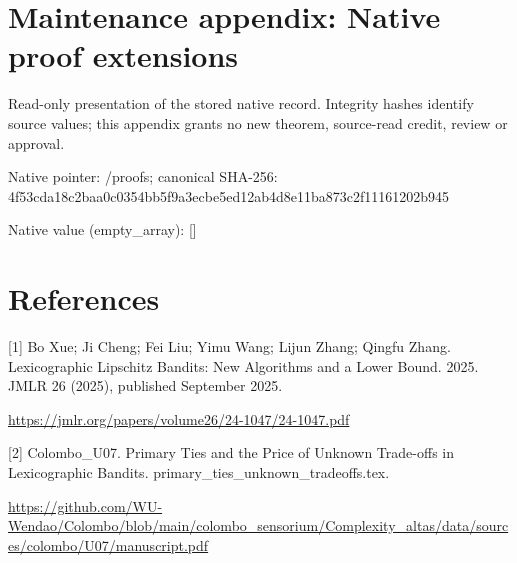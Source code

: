 \documentclass[10pt,a4paper]{article}
\begin{document}
\section{Maintenance appendix: Native proof extensions}


Read-only presentation of the stored native record. Integrity hashes identify source values; this appendix grants no new theorem, source-read credit, review or approval.



Native pointer: /proofs; canonical SHA-256: 4f53cda18c2baa0c0354bb5f\allowbreak{}9a3ecbe5ed12ab4d8e11ba87\allowbreak{}3c2f11161202b945



Native value (empty\_array): []



\section{References}


[1] Bo Xue; Ji Cheng; Fei Liu; Yimu Wang; Lijun Zhang; Qingfu Zhang. Lexicographic Lipschitz Bandits: New Algorithms and a Lower Bound. 2025. JMLR 26 (2025), published September 2025.



\url{https://jmlr.org/papers/volume26/24-1047/24-1047.pdf}



[2] Colombo\_U07. Primary Ties and the Price of Unknown Trade-offs in Lexicographic Bandits. primary\_ties\_unknown\_tradeoffs.tex.



\url{https://github.com/WU-Wendao/Colombo/blob/main/colombo_sensorium/Complexity_altas/data/sources/colombo/U07/manuscript.pdf}
\end{document}
